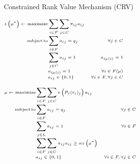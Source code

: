 \begin{algorithm}
    \caption{Constrained Rank Value Mechanism (CRV)}\label{alg:crv}
    \KwResult{\(\mu\)}
    \(\tiny
        \begin{aligned}
            z \left( \mu ^ { * } \right) \leftarrow \operatorname{maximize} & \sum_{i \in F} \sum_{j \in C} \pi_{i j} a_{i j} \\[-1mm]
            \operatorname {subject}\operatorname{to} & \sum_{i \in F} a_{i j}=q_{j} & \forall j \in C \\[-1mm]
            & \sum_{j \in C} a_{i j}=1 & a_{i \mu(i)}=1 \\[-1mm]
            & a_{i\mu (i)} = 1 &  \forall i \in F(\mu) \\[-1mm]
            & a_{i j} \in\{0,1\} & \forall i \in F, \forall j \in C
        \end{aligned}
    \)%

    \(\tiny
        \begin{aligned}
            \mu \leftarrow \operatorname{maximize} & \sum_{i \in F} \sum_{j \in C} v\left(P_r(r_i)_j\right) a_{i j} \\[-1mm]
            \operatorname {subject}\operatorname{to} & \sum_{i \in F} a_{i j}=q_{j} & \forall j \in C \\[-1mm]
            & \sum_{j \in L} a_{i j}=1 & \forall i \in F \\[-1mm]
            & \sum_{i \in F} \sum_{j \in C} \pi_{i j} a_{i j} \geq \alpha z \left( \mu ^ { * } \right) \\[-1mm]
            & a_{i j} \in\{0,1\} & \forall i \in F, \forall j \in C
        \end{aligned}
    \)%

\end{algorithm}

